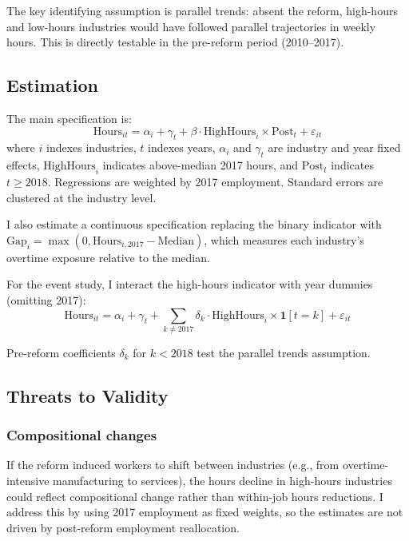 \documentclass[12pt]{article}
\begin{document}
The key identifying assumption is parallel trends: absent the reform, high-hours and low-hours industries would have followed parallel trajectories in weekly hours. This is directly testable in the pre-reform period (2010--2017).

\subsection{Estimation}

The main specification is:
\begin{equation}
\text{Hours}_{it} = \alpha_i + \gamma_t + \beta \cdot \text{HighHours}_i \times \text{Post}_t + \varepsilon_{it}
\label{eq:main}
\end{equation}
where $i$ indexes industries, $t$ indexes years, $\alpha_i$ and $\gamma_t$ are industry and year fixed effects, $\text{HighHours}_i$ indicates above-median 2017 hours, and $\text{Post}_t$ indicates $t \geq 2018$. Regressions are weighted by 2017 employment. Standard errors are clustered at the industry level.

I also estimate a continuous specification replacing the binary indicator with $\text{Gap}_i = \max(0, \text{Hours}_{i,2017} - \text{Median})$, which measures each industry's overtime exposure relative to the median.

For the event study, I interact the high-hours indicator with year dummies (omitting 2017):
\begin{equation}
\text{Hours}_{it} = \alpha_i + \gamma_t + \sum_{k \neq 2017} \delta_k \cdot \text{HighHours}_i \times \mathbf{1}[t = k] + \varepsilon_{it}
\label{eq:event}
\end{equation}

Pre-reform coefficients $\delta_k$ for $k < 2018$ test the parallel trends assumption.

\subsection{Threats to Validity}

\subsubsection*{Compositional changes} If the reform induced workers to shift between industries (e.g., from overtime-intensive manufacturing to services), the hours decline in high-hours industries could reflect compositional change rather than within-job hours reductions. I address this by using 2017 employment as fixed weights, so the estimates are not driven by post-reform employment reallocation.
\end{document}
